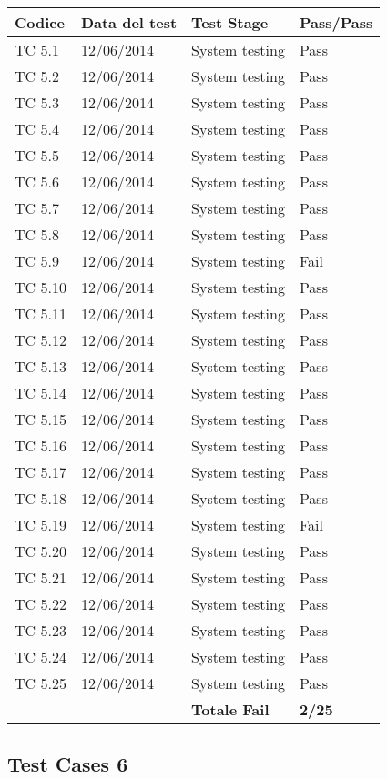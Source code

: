 \begin{tabular}{|p{3cm}|p{3cm}|p{3cm}|p{3cm}|}
	\hline
	\rowcolor{Gray}
	\textbf{Codice} & \textbf{Data del test} & \textbf{Test Stage} & \textbf{Pass/Pass}\tabularnewline
	\hline
	TC 5.1			& 12/06/2014 			& System testing		& Pass \tabularnewline
	\hline
	TC 5.2			& 12/06/2014 			& System testing		& Pass \tabularnewline
	\hline
	TC 5.3			& 12/06/2014 			& System testing		& Pass \tabularnewline
	\hline
	TC 5.4			& 12/06/2014 			& System testing		& Pass \tabularnewline
	\hline
	TC 5.5			& 12/06/2014 			& System testing		& Pass \tabularnewline
	\hline
	TC 5.6			& 12/06/2014 			& System testing		& Pass \tabularnewline
	\hline
	TC 5.7			& 12/06/2014 			& System testing		& Pass \tabularnewline
	\hline
	TC 5.8			& 12/06/2014 			& System testing		& Pass \tabularnewline
	\hline
	TC 5.9			& 12/06/2014 			& System testing		& Fail \tabularnewline
	\hline
	TC 5.10			& 12/06/2014 			& System testing		& Pass \tabularnewline
	\hline
	TC 5.11			& 12/06/2014 			& System testing		& Pass \tabularnewline
	\hline
	TC 5.12			& 12/06/2014 			& System testing		& Pass \tabularnewline
	\hline
	TC 5.13			& 12/06/2014 			& System testing		& Pass \tabularnewline
	\hline
	TC 5.14			& 12/06/2014 			& System testing		& Pass \tabularnewline
	\hline
	TC 5.15			& 12/06/2014 			& System testing		& Pass \tabularnewline
	\hline
	TC 5.16			& 12/06/2014 			& System testing		& Pass \tabularnewline
	\hline
	TC 5.17			& 12/06/2014 			& System testing		& Pass \tabularnewline
	\hline
	TC 5.18			& 12/06/2014 			& System testing		& Pass \tabularnewline
	\hline
	TC 5.19			& 12/06/2014 			& System testing		& Fail \tabularnewline
	\hline
	TC 5.20			& 12/06/2014 			& System testing		& Pass \tabularnewline
	\hline
	TC 5.21			& 12/06/2014 			& System testing		& Pass \tabularnewline
	\hline
	TC 5.22			& 12/06/2014 			& System testing		& Pass \tabularnewline
	\hline
	TC 5.23			& 12/06/2014 			& System testing		& Pass \tabularnewline
	\hline
	TC 5.24			& 12/06/2014 			& System testing		& Pass \tabularnewline
	\hline
	TC 5.25			& 12/06/2014 			& System testing		& Pass \tabularnewline
	\hline
					& 						& \textbf{Totale Fail}	& \textbf{2/25} \tabularnewline
	\hline
\end{tabular}

\subsection{Test Cases 6}

